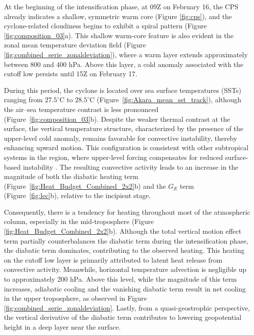 \documentclass[pdflatex,sn-chicago]{sn-jnl}%
\theoremstyle{plain}
\theoremstyle{definition}
\theoremstyle{remark}
\theoremstyle{definition}
\begin{document}
At the beginning of the intensification phase, at 09Z on February 16, the CPS already indicates a shallow, symmetric warm core (Figure \ref{fig:cps}), and the cyclone-related cloudiness begins to exhibit a spiral pattern (Figure \ref{fig:composition_03}a). This shallow warm-core feature is also evident in the zonal mean temperature deviation field (Figure \ref{fig:combined_serie_zonaldeviation}), where a warm layer extends approximately between 800 and 400 hPa. Above this layer, a cold anomaly associated with the cutoff low persists until 15Z on February 17. 

During this period, the cyclone is located over sea surface temperatures (SSTs) ranging from $27.5^{\circ}$C to $28.5^{\circ}$C (Figure~\ref{fig:Akara_mean_sst_track}), although the air–sea temperature contrast is less pronounced (Figure~\ref{fig:composition_03}b). Despite the weaker thermal contrast at the surface, the vertical temperature structure, characterized by the presence of the upper-level cold anomaly, remains favorable for convective instability, thereby enhancing upward motion. This configuration is consistent with other subtropical systems in the region, where upper-level forcing compensates for reduced surface-based instability \citep[e.g.,][]{reboita2022shapiro}. The resulting convective activity leads to an increase in the magnitude of both the diabatic heating term (Figure~\ref{fig:Heat_Budget_Combined_2x2}b) and the $G_E$ term (Figure~\ref{fig:lec}b), relative to the incipient stage.

Consequently, there is a tendency for heating throughout most of the atmospheric column, especially in the mid-troposphere (Figure \ref{fig:Heat_Budget_Combined_2x2}b). Although the total vertical motion effect term partially counterbalances the diabatic term during the intensification phase, the diabatic term dominates, contributing to the observed heating. This heating on the cutoff low layer is primarily attributed to latent heat release from convective activity. Meanwhile, horizontal temperature advection is negligible up to approximately 200 hPa. Above this level, while the magnitude of this term increases, adiabatic cooling and the vanishing diabatic term result in net cooling in the upper troposphere, as observed in Figure \ref{fig:combined_serie_zonaldeviation}. Lastly, from a quasi-geostrophic perspective, the vertical derivative of the diabatic term contributes to lowering geopotential height in a deep layer near the surface.
\end{document}
